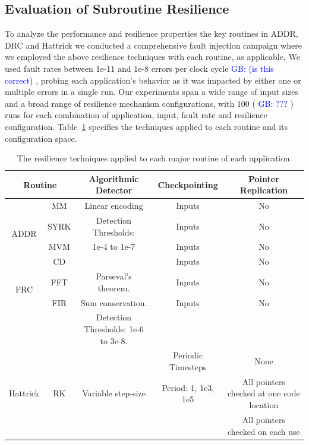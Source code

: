\documentclass[10pt, conference, compsocconf]{IEEEtran}
\newcommand{\greg}[1]{%
  \textcolor{blue}{GB: #1}
}
\begin{document}
\subsection{Evaluation of Subroutine Resilience}
\label{sec:res_tech:eval}

To analyze the performance and resilience properties the key routines in ADDR, DRC and Hattrick we conducted a comprehensive fault injection campaign where we employed the above resilience techniques with each routine, as applicable,
We used fault rates between 1e-11 and 1e-8 errors per clock cycle \greg{(is this correct)}, probing each application's behavior as it was impacted by either one or multiple errors in a single run.
Our experiments span a wide range of input sizes and a broad range of resilience mechanism configurations, with 100 (\greg{???}) runs for each combination of application, input, fault rate and resilience configuration.
Table~\ref{tbl:configs} specifies the techniques applied to each routine and its configuration space.
\begin{table}
  \begin{tabular}{|c|c|c|c|c|}
    \hline
    \multicolumn{2}{c}{Routine}          & Algorithmic Detector             & Checkpointing         & Pointer Replication  \\
    \hline
    \multirow{4}{*}{ADDR}      & MM   & Linear encoding                     & Inputs                & No \\
                               & SYRK & Detection Thresholds:               & Inputs                & No \\
                               & MVM  & 1e-4 to 1e-7                        & Inputs                & No \\
                               & CD   &                                     & Inputs                & No \\
    \hline
    \multirow{2}{*}{FRC}       & FFT  & Parseval's theorem.                 & Inputs                & No \\
                               & FIR  & Sum conservation.                   & Inputs                & No \\
                               &      & Detection Thresholds: 1e-6 to 3e-8. &                            \\
    \hline
    \multirow{3}{*}{Hattrick}  & \multirow{3}{*}{RK} & \multirow{3}{*}{Variable step-size} & Periodic Timesteps    & None  \\
                               &      &                                   & Period:  1, 1e3, 1e5 & All pointers checked at one code location \\
                               &      &                                   &                       & All pointers checked on each use \\
    \hline
  \end{tabular}
  \caption{The resilience techniques applied to each major routine of each application.}
  \label{tbl:configs}
\end{table}
\end{document}
